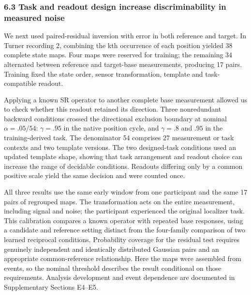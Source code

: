 \documentclass[11pt,a4paper]{article}
\begin{document}
\subsubsection{6.3 Task and readout design increase discriminability in
measured
noise}\label{task-and-readout-design-increase-discriminability-in-measured-noise}

We next used paired-residual inversion with error in both reference and
target. In Turner recording 2, combining the kth occurrence of each
position yielded 38 complete state maps. Four maps were reserved for
training; the remaining 34 alternated between reference and target-base
measurements, producing 17 pairs. Training fixed the state order, sensor
transformation, template and task-compatible readout.

Applying a known SR operator to another complete base measurement
allowed us to check whether this readout retained its direction. Three
nonredundant backward conditions crossed the directional exclusion
boundary at nominal \(\alpha=.05/54\): \(\gamma=.95\) in the native
position cycle, and \(\gamma=.8\) and \(.95\) in the training-derived
task. The denominator 54 comprises 27 measurement or task contexts and
two template versions. The two designed-task conditions used an updated
template shape, showing that task arrangement and readout choice can
increase the range of decidable conditions. Readouts differing only by a
common positive scale yield the same decision and were counted once.

All three results use the same early window from one participant and the
same 17 pairs of regrouped maps. The transformation acts on the entire
measurement, including signal and noise; the participant experienced the
original localizer task. This calibration compares a known operator with
repeated base responses, using a candidate and reference setting
distinct from the four-family comparison of two learned reciprocal
conditions. Probability coverage for the residual test requires
genuinely independent and identically distributed Gaussian pairs and an
appropriate common-reference relationship. Here the maps were assembled
from events, so the nominal threshold describes the result conditional
on those requirements. Analysis development and event dependence are
documented in Supplementary Sections E4–E5.
\end{document}
